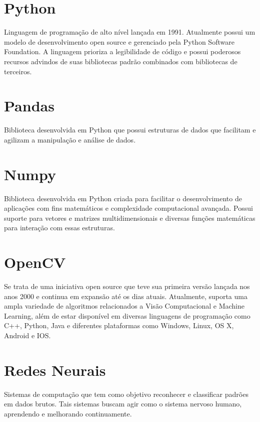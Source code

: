 \section{Python}
\indent
\par Linguagem de programação de alto nível lançada em 1991. Atualmente possui um modelo de desenvolvimento open source e gerenciado pela Python Software Foundation. A linguagem prioriza a legibilidade de código e possui poderosos recursos advindos de suas bibliotecas padrão combinados com bibliotecas de terceiros.

\section{Pandas}
\indent
\par Biblioteca desenvolvida em Python que possui estruturas de dados que facilitam e agilizam a manipulação e análise de dados.

\section{Numpy}
\indent
\par Biblioteca desenvolvida em Python criada para facilitar o desenvolvimento de aplicações com fins matemáticos e complexidade computacional avançada. Possui suporte para vetores e matrizes multidimensionais e diversas funções matemáticas para interação com essas estruturas.

\section{OpenCV}
\indent
\par Se trata de uma iniciativa open source que teve sua primeira versão lançada nos anos 2000 e continua em expansão até os dias atuais. Atualmente, suporta uma ampla variedade de algoritmos relacionados a Visão Computacional e Machine Learning, além de estar disponível em diversas linguagens de programação como C++, Python, Java e diferentes plataformas como Windows, Linux, OS X, Android e IOS.

\section{Redes Neurais}
\indent
\par Sistemas de computação que tem como objetivo reconhecer e classificar padrões em dados brutos. Tais sistemas buscam agir como o sistema nervoso humano, aprendendo e melhorando continuamente.

